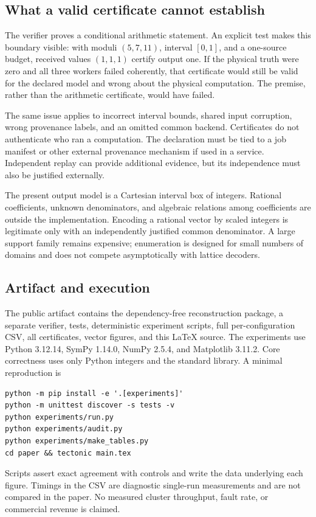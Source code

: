 \documentclass[11pt]{article}
\theoremstyle{definition}\newtheorem{definition}[theorem]{Definition}
\begin{document}
\subsection{What a valid certificate cannot establish}
The verifier proves a conditional arithmetic statement. An explicit test makes this boundary visible: with moduli $(5,7,11)$, interval $[0,1]$, and a one-source budget, received values $(1,1,1)$ certify output one. If the physical truth were zero and all three workers failed coherently, that certificate would still be valid for the declared model and wrong about the physical computation. The premise, rather than the arithmetic certificate, would have failed.

The same issue applies to incorrect interval bounds, shared input corruption, wrong provenance labels, and an omitted common backend. Certificates do not authenticate who ran a computation. The declaration must be tied to a job manifest or other external provenance mechanism if used in a service. Independent replay can provide additional evidence, but its independence must also be justified externally.

The present output model is a Cartesian interval box of integers. Rational coefficients, unknown denominators, and algebraic relations among coefficients are outside the implementation. Encoding a rational vector by scaled integers is legitimate only with an independently justified common denominator. A large support family remains expensive; enumeration is designed for small numbers of domains and does not compete asymptotically with lattice decoders.

\subsection{Artifact and execution}
The public artifact contains the dependency-free reconstruction package, a separate verifier, tests, deterministic experiment scripts, full per-configuration CSV, all certificates, vector figures, and this \LaTeX{} source. The experiments use Python 3.12.14, SymPy 1.14.0, NumPy 2.5.4, and Matplotlib 3.11.2. Core correctness uses only Python integers and the standard library. A minimal reproduction is
\begin{lstlisting}
python -m pip install -e '.[experiments]'
python -m unittest discover -s tests -v
python experiments/run.py
python experiments/audit.py
python experiments/make_tables.py
cd paper && tectonic main.tex
\end{lstlisting}
Scripts assert exact agreement with controls and write the data underlying each figure. Timings in the CSV are diagnostic single-run measurements and are not compared in the paper. No measured cluster throughput, fault rate, or commercial revenue is claimed.
\end{document}
